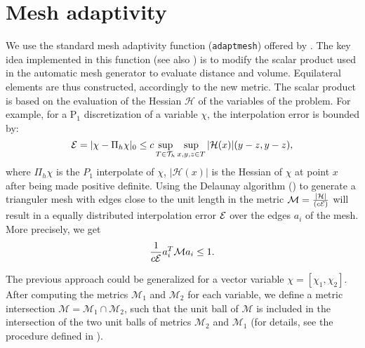  \section{Mesh adaptivity} \label{subs:FEadapt}
We use the standard mesh adaptivity function (\texttt{adaptmesh}) offered by \ff \citep{hecht-2012-JNM}. The key idea implemented in this function (see also \cite{hecht-1996-missi,hecht-2000-ijnmf,hecht-1997-aiaa,george-1998,frey-george-1999,moham-piron-2000})  is to modify the scalar product used in the automatic mesh generator to evaluate distance and volume.  Equilateral elements are thus constructed, accordingly to the new metric.  The scalar
product is based on the evaluation of the Hessian $\mathcal{H}$ of the variables of the problem. For example, for a P$_1$ discretization of a
variable $\chi$, the interpolation error is bounded by:
\begin{equation}
{\cal E } = |\chi - \Pi_h \chi |_0 \leq c \sup_{T\in \mathcal{T}_{h}} \sup_{x,y,z\in T}   |\mathcal{H}(x)|(y-z , y-z),
\label{eq1}
\end{equation}
where $\Pi_h \chi $ is the $P_1$ interpolate  of $\chi$, $ |\mathcal{H}(x)|$ is the  Hessian of $\chi$ at point $x$ after being made positive definite.
Using the Delaunay algorithm (\eg \cite{george-1998}) to generate a  trianguler mesh with edges close to the unit length  in the metric  $\mathcal{M} ={|\mathcal{H}| \over (c {\cal{E}})}$ will result in a equally distributed  interpolation error ${\cal E}$ over the edges $a_i$ of the mesh. More precisely, we get
\begin{equation}
{1 \over c {\cal E}} a_i^T {\cal M } a_i \le 1.
\end{equation}


The previous approach could be generalized for a vector variable $\chi=[\chi_1, \chi_2]$. After computing the metrics $\mathcal{M}_{1}$ and $\mathcal{M}_{2}$ for each variable, we define a metric intersection  $\mathcal{M} = \mathcal{M}_{1} \cap \mathcal{M}_{2}$,
such that the unit ball of $\mathcal{M}$ is included in  the intersection of the two  unit balls  of metrics $\mathcal{M}_{2}$ and $\mathcal{M}_{1}$
(for details, see the  procedure defined in \cite{frey-george-1999}).



